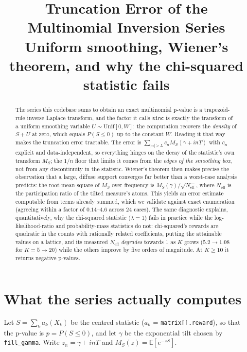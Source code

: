 \documentclass[11pt]{article}
\title{Truncation Error of the Multinomial Inversion Series\\
\large Uniform smoothing, Wiener's theorem, and why the chi-squared statistic fails}
\author{}
\date{}
\newcommand{\Neff}{N_{\mathrm{eff}}}
\begin{document}
\maketitle

\begin{abstract}
The series this codebase sums to obtain an exact multinomial p-value is a trapezoid-rule inverse
Laplace transform, and the factor it calls \texttt{sinc} is exactly the transform of a uniform
smoothing variable $U\sim\mathrm{Unif}[0,W]$: the computation recovers the \emph{density} of $S+U$
at zero, which equals $P(S\le0)$ up to the constant $W$. Reading it that way makes the truncation
error tractable. The error is $\sum_{|n|>L}c_n M_S(\gamma+inT)$ with $c_n$ explicit and
data-independent, so everything hinges on the decay of the statistic's own transform $M_S$; the
$1/n$ floor that limits it comes from the \emph{edges of the smoothing box}, not from any
discontinuity in the statistic. Wiener's theorem then makes precise the observation that a large,
diffuse support converges far better than a worst-case analysis predicts: the root-mean-square of
$M_S$ over frequency is $M_S(\gamma)/\sqrt{\Neff}$, where $\Neff$ is the participation ratio of the
tilted measure's atoms. This yields an error estimate computable from terms already summed, which
we validate against exact enumeration (agreeing within a factor of $0.14$–$4.6$ across 24 cases).
The same diagnostic explains, quantitatively, why the chi-squared statistic ($\lambda=1$) fails in
practice while the log-likelihood-ratio and probability-mass statistics do not: chi-squared's
rewards are quadratic in the counts with rationally related coefficients, putting the attainable
values on a lattice, and its measured $\Neff$ \emph{degrades} towards $1$ as $K$ grows
($5.2\to1.08$ for $K=5\to20$) while the others improve by five orders of magnitude. At $K\ge10$ it
returns negative p-values.
\end{abstract}

\tableofcontents

\section{What the series actually computes}
\label{sec:setup}

Let $S=\sum_k a_k(X_k)$ be the centred statistic ($a_k$ = \texttt{matrix[].reward}), so that the
p-value is $p=P(S\le0)$, and let $\gamma$ be the exponential tilt chosen by \texttt{fill\_gamma}.
Write $z_n=\gamma+inT$ and $M_S(z)=\mathbb E[e^{-zS}]$.
\end{document}
